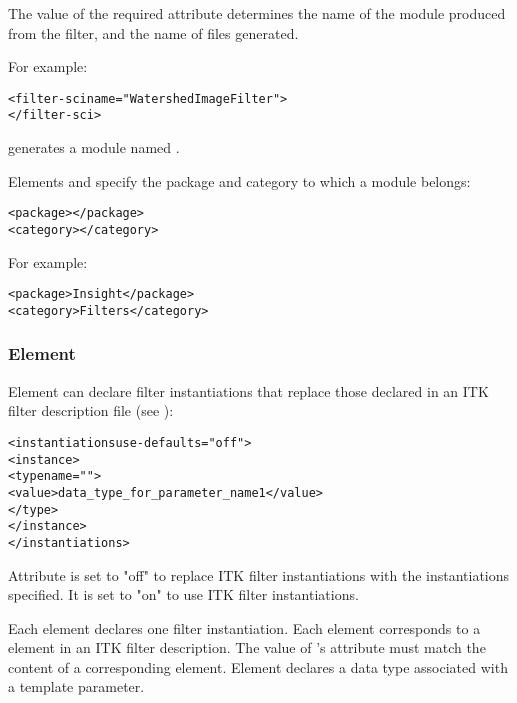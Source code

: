 The value of the required  attribute determines the name of
the \sr{} module produced from the filter, and the name of files generated. 

For example:

\begin{alltt}
  <filter-sci name="WatershedImageFilter">
  \velide
  </filter-sci>
\end{alltt}

generates a module named .

Elements  and  specify
the package and category to which a module belongs:

\begin{alltt}
  <package></package>
  <category></category>
\end{alltt}

For example:

\begin{alltt}
  <package>Insight</package>
  <category>Filters</category>
\end{alltt}

\subsubsection{Element }

Element  can declare filter instantiations
that replace those declared in an ITK filter description file (see
):

\begin{alltt}
  <instantiations use-defaults="off">
    <instance>
      <type name="">
        <value>data\_type\_for\_parameter\_name1</value>
      </type>
    </instance>
    \velide  
  </instantiations>
\end{alltt}

Attribute  is set to "off" to replace ITK
filter instantiations with the instantiations specified.  It is set to
"on" to use ITK filter instantiations.

Each  element declares one filter instantiation.
Each  element corresponds to a
 element in an ITK filter description.  The
value of 's  attribute must match
the content of a corresponding  element.
Element  declares a data type associated with
a template parameter.  

